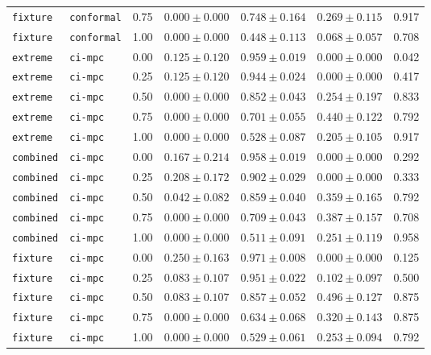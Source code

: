 \documentclass{article}
\begin{document}
\begin{center}
\begin{tabular}{lllcccc}
\texttt{fixture} & \texttt{conformal} & 0.75 & $0.000 \pm 0.000$ & $0.748 \pm 0.164$ & $0.269 \pm 0.115$ & 0.917 \\
\texttt{fixture} & \texttt{conformal} & 1.00 & $0.000 \pm 0.000$ & $0.448 \pm 0.113$ & $0.068 \pm 0.057$ & 0.708 \\
\texttt{extreme} & \texttt{ci-mpc} & 0.00 & $0.125 \pm 0.120$ & $0.959 \pm 0.019$ & $0.000 \pm 0.000$ & 0.042 \\
\texttt{extreme} & \texttt{ci-mpc} & 0.25 & $0.125 \pm 0.120$ & $0.944 \pm 0.024$ & $0.000 \pm 0.000$ & 0.417 \\
\texttt{extreme} & \texttt{ci-mpc} & 0.50 & $0.000 \pm 0.000$ & $0.852 \pm 0.043$ & $0.254 \pm 0.197$ & 0.833 \\
\texttt{extreme} & \texttt{ci-mpc} & 0.75 & $0.000 \pm 0.000$ & $0.701 \pm 0.055$ & $0.440 \pm 0.122$ & 0.792 \\
\texttt{extreme} & \texttt{ci-mpc} & 1.00 & $0.000 \pm 0.000$ & $0.528 \pm 0.087$ & $0.205 \pm 0.105$ & 0.917 \\
\texttt{combined} & \texttt{ci-mpc} & 0.00 & $0.167 \pm 0.214$ & $0.958 \pm 0.019$ & $0.000 \pm 0.000$ & 0.292 \\
\texttt{combined} & \texttt{ci-mpc} & 0.25 & $0.208 \pm 0.172$ & $0.902 \pm 0.029$ & $0.000 \pm 0.000$ & 0.333 \\
\texttt{combined} & \texttt{ci-mpc} & 0.50 & $0.042 \pm 0.082$ & $0.859 \pm 0.040$ & $0.359 \pm 0.165$ & 0.792 \\
\texttt{combined} & \texttt{ci-mpc} & 0.75 & $0.000 \pm 0.000$ & $0.709 \pm 0.043$ & $0.387 \pm 0.157$ & 0.708 \\
\texttt{combined} & \texttt{ci-mpc} & 1.00 & $0.000 \pm 0.000$ & $0.511 \pm 0.091$ & $0.251 \pm 0.119$ & 0.958 \\
\texttt{fixture} & \texttt{ci-mpc} & 0.00 & $0.250 \pm 0.163$ & $0.971 \pm 0.008$ & $0.000 \pm 0.000$ & 0.125 \\
\texttt{fixture} & \texttt{ci-mpc} & 0.25 & $0.083 \pm 0.107$ & $0.951 \pm 0.022$ & $0.102 \pm 0.097$ & 0.500 \\
\texttt{fixture} & \texttt{ci-mpc} & 0.50 & $0.083 \pm 0.107$ & $0.857 \pm 0.052$ & $0.496 \pm 0.127$ & 0.875 \\
\texttt{fixture} & \texttt{ci-mpc} & 0.75 & $0.000 \pm 0.000$ & $0.634 \pm 0.068$ & $0.320 \pm 0.143$ & 0.875 \\
\texttt{fixture} & \texttt{ci-mpc} & 1.00 & $0.000 \pm 0.000$ & $0.529 \pm 0.061$ & $0.253 \pm 0.094$ & 0.792 \\

\end{tabular}
\end{center}
\end{document}
